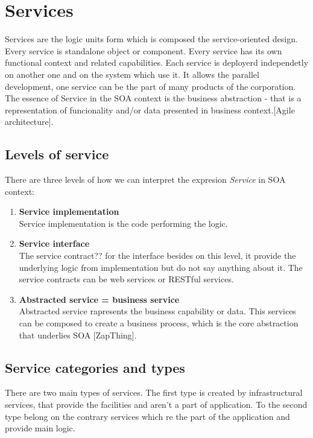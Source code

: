 \section{Services}
\label{sec:services}
Services are the logic units form which is composed the service-oriented design. Every service is standalone object or component. Every service has its own functional context and related capabilities. Each service is deployerd independetly on another one and on the system which use it. It allows the parallel development, one service can be the part of many products of the corporation.
The essence of Service in the SOA context is the business abstraction - that is a representation of funcionality and/or data presented in business context.[Agile architecture].

\subsection{Levels of service} 

There are three levels of how we can interpret the expresion \emph{Service} in SOA context:
\begin{enumerate}
  \item \textbf{Service implementation} \hfill \\
Service implementation is the code performing the logic.
  \item \textbf{Service interface} \hfill \\ 
The service contract?? for the interface besides on this level, it provide the underlying logic from implementation but do not say anything about it. The service contracts can be web services or RESTful services.
  \item \textbf{Abstracted service = business service} \hfill \\
Abstracted service rapresents the business capability or data. This services can be composed to create a business process, which is the core abstraction that underlies SOA [ZapThing].
\end{enumerate}

\subsection{Service categories and types} %

There are two main types of services. The first type is created by infrastructural services, that provide the facilities and aren't a part of application. To the second type belong on the contrary services which re the part of the application and provide main logic.

